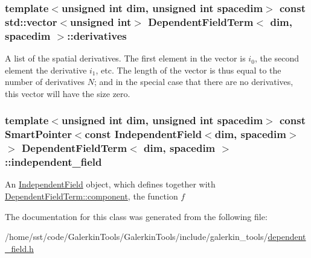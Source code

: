 \subsubsection[{\texorpdfstring{derivatives}{derivatives}}]{\setlength{\rightskip}{0pt plus 5cm}template$<$unsigned int dim, unsigned int spacedim$>$ const std\+::vector$<$unsigned int$>$ {\bf Dependent\+Field\+Term}$<$ dim, spacedim $>$\+::derivatives}\hypertarget{class_dependent_field_term_af09c5452c3e8e71e9ee99db304b90135}{}\label{class_dependent_field_term_af09c5452c3e8e71e9ee99db304b90135}
A list of the spatial derivatives. The first element in the vector is $i_0$, the second element the derivative $i_1$, etc. The length of the vector is thus equal to the number of derivatives $N$; and in the special case that there are no derivatives, this vector will have the size zero. 
\subsubsection[{\texorpdfstring{independent\+\_\+field}{independent_field}}]{\setlength{\rightskip}{0pt plus 5cm}template$<$unsigned int dim, unsigned int spacedim$>$ const {\bf Smart\+Pointer}$<$const {\bf Independent\+Field}$<$dim, spacedim$>$ $>$ {\bf Dependent\+Field\+Term}$<$ dim, spacedim $>$\+::independent\+\_\+field}\hypertarget{class_dependent_field_term_a89d1c3fea36e6fe105232097a321e095}{}\label{class_dependent_field_term_a89d1c3fea36e6fe105232097a321e095}
An \hyperlink{class_independent_field}{Independent\+Field} object, which defines together with \hyperlink{class_dependent_field_term_ac6f3ac40d4ee2c8b9f9bbdfa34079b74}{Dependent\+Field\+Term\+::component}, the function $f$ 

The documentation for this class was generated from the following file\+:\begin{DoxyCompactItemize}
\item 
/home/sst/code/\+Galerkin\+Tools/\+Galerkin\+Tools/include/galerkin\+\_\+tools/\hyperlink{dependent__field_8h}{dependent\+\_\+field.\+h}\end{DoxyCompactItemize}
